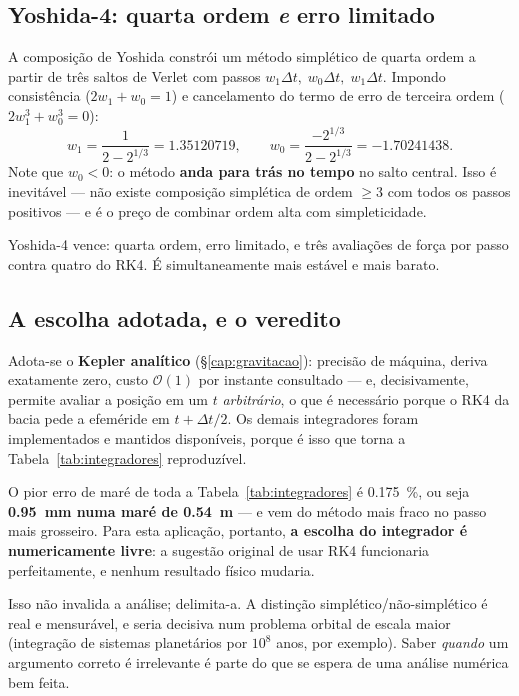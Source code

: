 \documentclass[11pt,a4paper,oneside]{report}
\theoremstyle{definition}
\theoremstyle{plain}
\theoremstyle{remark}
\newcommand{\ordem}[1]{\mathcal{O}\!\left(#1\right)}
\begin{document}
\subsection{Yoshida-4: quarta ordem \emph{e} erro limitado}

A composição de Yoshida \cite{yoshida1990} constrói um método simplético de
quarta ordem a partir de três saltos de Verlet com passos
$w_1\Delta t,\;w_0\Delta t,\;w_1\Delta t$. Impondo consistência
($2w_1+w_0=1$) e cancelamento do termo de erro de terceira ordem
($2w_1^{3}+w_0^{3}=0$):
\begin{equation}
w_1=\frac{1}{2-2^{1/3}}=\num{1.35120719},\qquad
w_0=\frac{-2^{1/3}}{2-2^{1/3}}=\num{-1.70241438}.
\end{equation}
Note que $w_0<0$: o método \textbf{anda para trás no tempo} no salto central.
Isso é inevitável — não existe composição simplética de ordem $\ge 3$ com todos
os passos positivos — e é o preço de combinar ordem alta com simpleticidade.

Yoshida-4 vence: quarta ordem, erro limitado, e três avaliações de força por
passo contra quatro do RK4. É simultaneamente mais estável e mais barato.

\subsection{A escolha adotada, e o veredito}
\label{sec:kepleranalitico}

Adota-se o \textbf{Kepler analítico} (\S\ref{cap:gravitacao}): precisão de
máquina, deriva exatamente zero, custo $\ordem{1}$ por instante consultado — e,
decisivamente, permite avaliar a posição em um $t$ \emph{arbitrário}, o que é
necessário porque o RK4 da bacia pede a efeméride em $t+\Delta t/2$. Os demais
integradores foram implementados e mantidos disponíveis, porque é isso que torna
a Tabela~\ref{tab:integradores} reproduzível.

\begin{caixa}
O pior erro de maré de toda a Tabela~\ref{tab:integradores} é
\SI{0.175}{\percent}, ou seja \textbf{\SI{0.95}{\milli\meter} numa maré de
\SI{0.54}{\meter}} — e vem do método mais fraco no passo mais grosseiro. Para
esta aplicação, portanto, \textbf{a escolha do integrador é numericamente
livre}: a sugestão original de usar RK4 funcionaria perfeitamente, e nenhum
resultado físico mudaria.

Isso não invalida a análise; delimita-a. A distinção
simplético/não-simplético é real e mensurável, e seria decisiva num problema
orbital de escala maior (integração de sistemas planetários por $10^{8}$ anos,
por exemplo). Saber \emph{quando} um argumento correto é irrelevante é parte do
que se espera de uma análise numérica bem feita.
\end{caixa}
\end{document}
